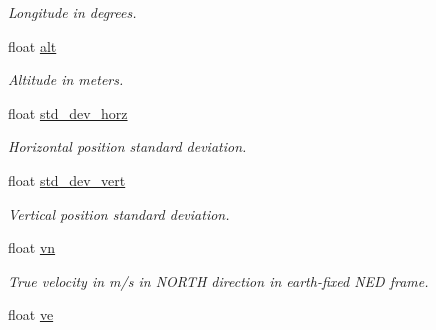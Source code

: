 \begin{DoxyCompactItemize}
\begin{DoxyCompactList}\small\item\em Longitude in degrees. \end{DoxyCompactList}\item 
\hypertarget{struct____mavlink__sim__state__t_a2a8b47ade532ffc0a80aed65972d61f6}{float \hyperlink{struct____mavlink__sim__state__t_a2a8b47ade532ffc0a80aed65972d61f6}{alt}}\label{struct____mavlink__sim__state__t_a2a8b47ade532ffc0a80aed65972d61f6}

\begin{DoxyCompactList}\small\item\em Altitude in meters. \end{DoxyCompactList}\item 
\hypertarget{struct____mavlink__sim__state__t_a9a60403fc2a9ff47b8b2132972968617}{float \hyperlink{struct____mavlink__sim__state__t_a9a60403fc2a9ff47b8b2132972968617}{std\+\_\+dev\+\_\+horz}}\label{struct____mavlink__sim__state__t_a9a60403fc2a9ff47b8b2132972968617}

\begin{DoxyCompactList}\small\item\em Horizontal position standard deviation. \end{DoxyCompactList}\item 
\hypertarget{struct____mavlink__sim__state__t_a2176290431f1ee212e6d569e495a219f}{float \hyperlink{struct____mavlink__sim__state__t_a2176290431f1ee212e6d569e495a219f}{std\+\_\+dev\+\_\+vert}}\label{struct____mavlink__sim__state__t_a2176290431f1ee212e6d569e495a219f}

\begin{DoxyCompactList}\small\item\em Vertical position standard deviation. \end{DoxyCompactList}\item 
\hypertarget{struct____mavlink__sim__state__t_a7a3506208fd5f6d14bd68fc39f6f1f04}{float \hyperlink{struct____mavlink__sim__state__t_a7a3506208fd5f6d14bd68fc39f6f1f04}{vn}}\label{struct____mavlink__sim__state__t_a7a3506208fd5f6d14bd68fc39f6f1f04}

\begin{DoxyCompactList}\small\item\em True velocity in m/s in N\+O\+R\+T\+H direction in earth-\/fixed N\+E\+D frame. \end{DoxyCompactList}\item 
\hypertarget{struct____mavlink__sim__state__t_a1cf4dd8696eabaee1a9817bc5cae8cf1}{float \hyperlink{struct____mavlink__sim__state__t_a1cf4dd8696eabaee1a9817bc5cae8cf1}{ve}}\label{struct____mavlink__sim__state__t_a1cf4dd8696eabaee1a9817bc5cae8cf1}


\end{DoxyCompactItemize}
